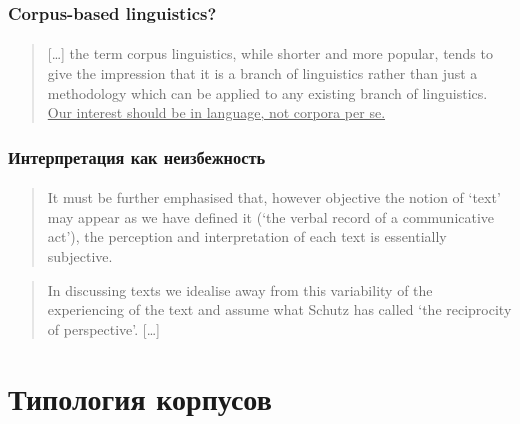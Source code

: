 \begin{frame}
    \frametitle{Corpus-based linguistics?}
    \framesubtitle{\autocite{weisser:2016}}

    \begin{quote}
        [\ldots] the term corpus linguistics, while shorter and more popular, tends to give the impression that it is a branch of linguistics rather than just a methodology which can be applied to any existing branch of linguistics. \underline{Our interest should be in language, not corpora per se.}
    \end{quote}
\end{frame}

\begin{frame}
    \frametitle{Интерпретация как неизбежность}
    \framesubtitle{\autocite[6--12]{brown_yule:1983}}

    \begin{quote}
        It must be further emphasised that, however objective the notion of `text' may appear as we have defined it (`the verbal record of a communicative act'), the perception and interpretation of each text is essentially subjective.
    \end{quote}

    \begin{quote}
        In discussing texts we idealise away from this variability of the experiencing of the text and assume what Schutz has called `the reciprocity of perspective'. [\ldots]
    \end{quote}
\end{frame}

\section{Типология корпусов}

\frame{\tableofcontents[currentsection]}

